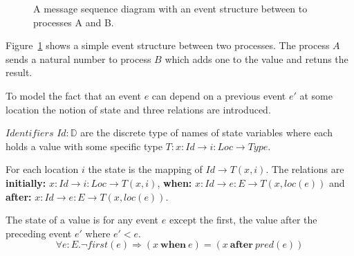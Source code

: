 \begin{figure}
  \center
  \label{fig:sequence}
  \caption{A message sequence diagram with an event structure between to
    processes A and B.}
\end{figure}

Figure~\ref{fig:sequence} shows a simple event structure between two
processes. The process $A$ sends a natural number to process $B$ which adds
one to the value and retuns the result.

To model the fact that an event $e$ can depend on a previous event $e'$ at
some location the notion of state and three relations are introduced.~\cite{bickford2005causal}

\begin{defi}
  $Identifiers$ $Id:\mathbb{D}$ are the discrete type of names of state variables where each
  holds a value with some specific type $T:x:Id\rightarrow i:Loc\rightarrow Type$.
\end{defi}

\begin{defi}
  For each location $i$ the state is the mapping of $Id\rightarrow T(x,i)$.
  The relations are \textbf{initially:} $x:Id\rightarrow i:Loc\rightarrow T(x,i)$,
  \textbf{when:} $x:Id\rightarrow e:E\rightarrow T(x,loc(e))$ and \textbf{after:} $x:Id\rightarrow e:E\rightarrow T(x,loc(e))$.
\end{defi}

\begin{axiom}
  The state of a value is for any event $e$ except the first, the value after
  the preceding event $e'$ where $e'<e$.
  \[\forall e:E.\neg first(e)\Rightarrow (x\ \textbf{when}\ e) = (x\ \textbf{after}\ pred(e))\]
\end{axiom}

